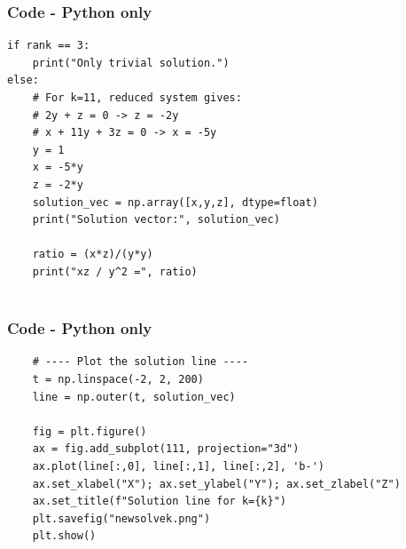 \documentclass{beamer}
\theoremstyle{remark}
\numberwithin{equation}{section}
\begin{document}
\begin{frame}[fragile]
\frametitle{Code - Python only}
\begin{lstlisting}
if rank == 3:
    print("Only trivial solution.")
else:
    # For k=11, reduced system gives:
    # 2y + z = 0 -> z = -2y
    # x + 11y + 3z = 0 -> x = -5y
    y = 1
    x = -5*y
    z = -2*y
    solution_vec = np.array([x,y,z], dtype=float)
    print("Solution vector:", solution_vec)

    ratio = (x*z)/(y*y)
    print("xz / y^2 =", ratio)


\end{lstlisting}
\end{frame}

\begin{frame}[fragile]
\frametitle{Code - Python only}
\begin{lstlisting}
    # ---- Plot the solution line ----
    t = np.linspace(-2, 2, 200)
    line = np.outer(t, solution_vec)

    fig = plt.figure()
    ax = fig.add_subplot(111, projection="3d")
    ax.plot(line[:,0], line[:,1], line[:,2], 'b-')
    ax.set_xlabel("X"); ax.set_ylabel("Y"); ax.set_zlabel("Z")
    ax.set_title(f"Solution line for k={k}")
    plt.savefig("newsolvek.png")
    plt.show()


\end{lstlisting}
\end{frame}
\end{document}
